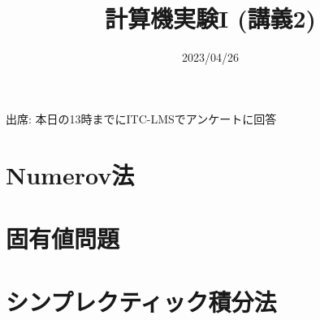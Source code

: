 \documentclass[10pt,dvipdfmx]{beamer}
\title{計算機実験I (講義2)}
\date{2023/04/26}
\begin{document}
\begin{frame}
  \titlepage
  \tableofcontents
  出席: 本日の13時までにITC-LMSでアンケートに回答
\end{frame}



\section{Numerov法}





\section{固有値問題}




\section{シンプレクティック積分法}














\section{}

\end{document}
